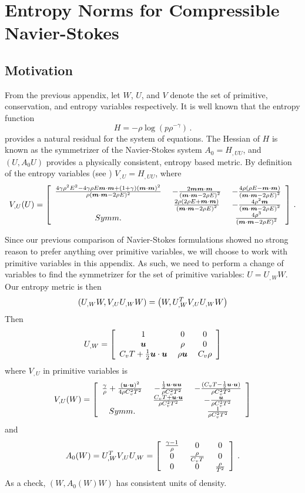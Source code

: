 \documentclass[Dissertation.tex]{subfiles}
\begin{document}
\chapter{Entropy Norms for Compressible Navier-Stokes}
\label{sec:EntropyNorm}
\section{Motivation}

From the previous appendix, let $W$, $U$, and $V$ denote the set of primitive, conservation, and
entropy variables respectively.
It is well known that the entropy function
\[
H=-\rho\log(p\rho^{-\gamma})\,.
\]
provides a natural residual for the system of equations.
The Hessian of $H$ is known as the symmetrizer of the Navier-Stokes system
$A_0=H_{,UU}$, and $(U,A_0U)$ provides a physically consistent, entropy based metric.
By definition of the entropy variables (see \cite{HughesEntropyVariables}) $V_{,U}=H_{,UU}$, where
\[
V_{,U}(U)=\left[ \begin{array}{ccc} \frac{4\gamma\rho^2E^2-4\gamma\rho E\boldsymbol m\cdot\boldsymbol m+(1+\gamma)(\boldsymbol m\cdot\boldsymbol m)^2}{\rho(\boldsymbol m\cdot\boldsymbol m-2\rho E)^2}\; & -\frac{2\boldsymbol m\boldsymbol m\cdot\boldsymbol m}{\left( \boldsymbol m\cdot\boldsymbol m-2\rho E \right)^2}\; & -\frac{4\rho(\rho E-\boldsymbol m\cdot\boldsymbol m)}{\left( \boldsymbol m\cdot\boldsymbol m-2\rho E \right)^2}\\ \; & \frac{2\rho(2\rho E+\boldsymbol m\cdot\boldsymbol m)}{\left( \boldsymbol m\cdot\boldsymbol m-2\rho E \right)^2}\; & -\frac{4\rho^2\boldsymbol m}{\left( \boldsymbol m\cdot\boldsymbol m-2\rho E \right)^2}\\ Symm.\; & \; & \frac{4\rho^3}{\left( \boldsymbol m\cdot\boldsymbol m-2\rho E \right)^2}\\ \end{array} \right]\,.
\]

Since our previous comparison of Navier-Stokes formulations showed no strong reason to 
prefer anything over primitive variables, we will choose to work with primitive variables 
in this appendix. 
As such, we need to perform a change of variables to find the symmetrizer for the set of primitive variables:
$U=U_{,W}W$.
Our entropy metric is then
\[
\left( U_{,W} W,V_{,U}U_{,W} W \right)=\left(  W,U_{,W}^TV_{,U}U_{,W} W \right)
\]
Then
\[
U_{,W}=\left[ \begin{array}{ccc} 1\; & 0\; & 0\\ \boldsymbol u\; & \rho\; & 0\\ C_vT+\frac{1}{2}\boldsymbol u\cdot\boldsymbol u\; & \rho\boldsymbol u\; & C_v\rho\\ \end{array} \right]
\]
where $V_{,U}$ in primitive variables is
\[
V_{,U}(W)=\left[ \begin{array}{ccc} \frac{\gamma}{\rho}+\frac{(\boldsymbol u\cdot\boldsymbol u)^2}{4\rho C_v^2 T^2}\; & -\frac{\frac{1}{2}\boldsymbol u\cdot\boldsymbol u\boldsymbol u}{\rho C_v^2 T^2}\; & -\frac{(C_v T-\frac{1}{2}\boldsymbol u\cdot\boldsymbol u)}{\rho C_v^2 T^2}\\ \; & \frac{C_v T+\boldsymbol u\cdot\boldsymbol u}{\rho C_v^2 T^2}\; & -\frac{\boldsymbol u}{\rho C_v^2 T^2}\\ Symm.\; & \; & \frac{1}{\rho C_v^2 T^2}\\ \end{array} \right]
\]
and
\[
A_0(W)=U_{,W}^TV_{,U}U_{,W}=\left[ \begin{array}{ccc} \frac{\gamma-1}{\rho}\; & 0\; & 0\\ 0\; & \frac{\rho}{C_v T}\; & 0\\ 0\; & 0\; & \frac{\rho}{T^2}\\ \end{array} \right]\,.
\]
As a check, $(W,A_0(W)W)$ has consistent units of density.
\end{document}
